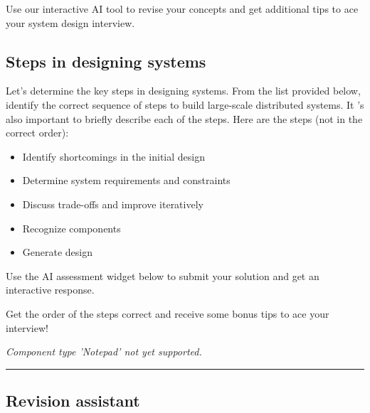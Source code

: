 

Use our interactive AI tool to revise your concepts and get additional tips to ace your system design interview.

\subsection{Steps in designing systems}\label{iIFADS1Z1aS3yNdvBvp0m}

Let's determine the key steps in designing systems. From the list provided below, identify the correct sequence of steps to build large-scale distributed systems. It 's also important to briefly describe each of the steps. Here are the steps (not in the correct order):

\begin{itemize}
\item
{}\label{fUzmdxxK_XycEIVnWUIuI}
Identify shortcomings in the initial design
\item
{}\label{0eFc0h3Wt1YfDJp4gnXqN}
Determine system requirements and constraints
\item
{}\label{qOg19ZKT4UVfX3F14vPxJ}
Discuss trade-offs and improve iteratively
\item
{}\label{IOr1G1mclMp236wuOhJwv}
Recognize components
\item
{}\label{To5lkBmC-9Hv_HvPBzSqP}
Generate design
\end{itemize}

Use the AI assessment widget below to submit your solution and get an interactive response.

Get the order of the steps correct and receive some bonus tips to ace your interview!

\textit{Component type 'Notepad' not yet supported.}

\begin{center}\rule{0.5\linewidth}{0.5pt}\end{center}

\subsection{Revision assistant}\label{X1XO5HrrOnWUqBIe_zOhz}

